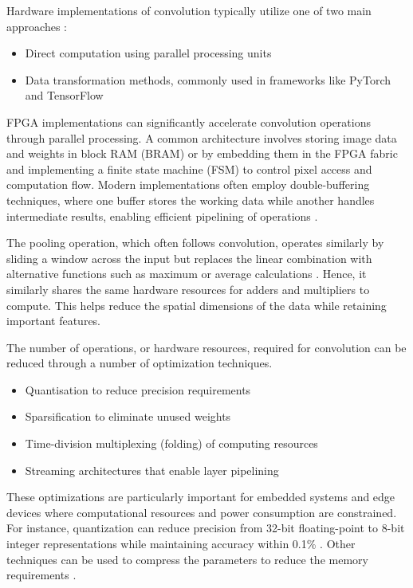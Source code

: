 Hardware implementations of convolution typically utilize one of two main approaches \cite{1}:
\begin{itemize}
    \item Direct computation using parallel processing units
    \item Data transformation methods, commonly used in frameworks like PyTorch and TensorFlow
\end{itemize}

FPGA implementations can significantly accelerate convolution operations through parallel processing. 
A common architecture involves storing image data and weights in block RAM (BRAM) \cite{7} or by embedding them in the FPGA fabric \cite{20} and implementing a finite state machine (FSM) to control pixel access and computation flow. 
Modern implementations often employ double-buffering techniques, where one buffer stores the working data while another handles intermediate results, enabling efficient pipelining of operations \cite{14}.

The pooling operation, which often follows convolution, operates similarly by sliding a window across the input but replaces the linear combination with alternative functions such as maximum or average calculations \cite{19}. 
Hence, it similarly shares the same hardware resources for adders and multipliers to compute.
This helps reduce the spatial dimensions of the data while retaining important features.

The number of operations, or hardware resources, required for convolution can be reduced through a number of optimization techniques. 
\begin{itemize}
    \item Quantisation to reduce precision requirements \cite{12}
    \item Sparsification to eliminate unused weights \cite{11}
    \item Time-division multiplexing (folding) of computing resources \cite{14}
    \item Streaming architectures that enable layer pipelining \cite{16}
\end{itemize}

These optimizations are particularly important for embedded systems and edge devices where computational resources and power consumption are constrained. 
For instance, quantization can reduce precision from 32-bit floating-point to 8-bit integer representations while maintaining accuracy within 0.1\% \cite{12}.
Other techniques can be used to compress the parameters to reduce the memory requirements \cite{18}.

